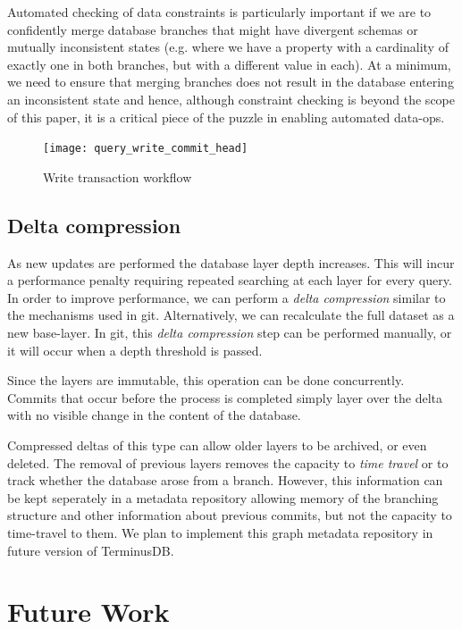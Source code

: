 \documentclass[10pt, a4paper, twocolumn]{article} %
\begin{document}
Automated checking of data constraints is particularly important if we
are to confidently merge database branches that might have divergent
schemas or mutually inconsistent states (e.g. where we have a property
with a cardinality of exactly one in both branches, but with a
different value in each). At a minimum, we need to ensure that merging
branches does not result in the database entering an inconsistent
state and hence, although constraint checking is beyond the scope of
this paper, it is a critical piece of the puzzle in enabling automated
data-ops\autocite{gleason2018}.

\begin{figure}
	\texttt{[image: query\_write\_commit\_head]} %
	\caption{Write transaction workflow} %
	\label{workflow} %
\end{figure}


\subsection{Delta compression}

As new updates are performed the database layer depth increases. This
will incur a performance penalty requiring repeated searching at each
layer for every query. In order to improve performance, we can perform
a {\em delta compression} similar to the mechanisms used in
git. Alternatively, we can recalculate the full dataset as a new
base-layer. In git, this {\em delta compression} step can be performed
manually, or it will occur when a depth threshold is passed.

Since the layers are immutable, this operation can be done
concurrently. Commits that occur before the process is completed simply
layer over the delta with no visible change in the content of
the database.

Compressed deltas of this type can allow older layers to be archived,
or even deleted. The removal of previous layers removes the capacity
to {\em time travel} or to track whether the database arose from a
branch. However, this information can be kept seperately in a metadata
repository allowing memory of the branching structure and other
information about previous commits, but not the capacity to
time-travel to them. We plan to implement this graph metadata
repository in future version of TerminusDB.

\section{Future Work}
\end{document}
